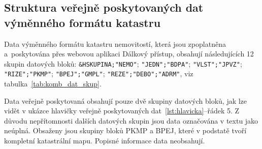 \subsection{Struktura veřejně poskytovaných dat výměnného formátu katastru}
\label{subsec:neuplna_data}

Data výměnného formátu katastru nemovitostí, která jsou
zpoplatněna a~poskytována přes webovou aplikaci Dálkový přístup,
obsahují následujících 12 skupin datových bloků:
\verb|&HSKUPINA;"NEMO"|; \verb|"JEDN";"BDPA"|; \verb|"VLST";"JPVZ"|;
\verb|"RIZE";"PKMP"|; \verb|"BPEJ";"GMPL"|;
\verb|"REZE";"DEBO";"ADRM"|, viz tabulka~\ref{tab:komb_dat_skup}.

Data veřejně poskytovaná obsahují pouze dvě skupiny datových bloků, jak lze vidět v
ukázce hlavičky veřejně poskytovaných dat~\ref{lst:hlavicka}--řádek 5. Z důvodu
nepřítomnosti dalších datových skupin jsou data označována v textu jako
neúplná. Obsaženy jsou skupiny bloků PKMP a BPEJ, které v podstatě tvoří
kompletní katastrální mapu. Popisné informace data neobsahují.

